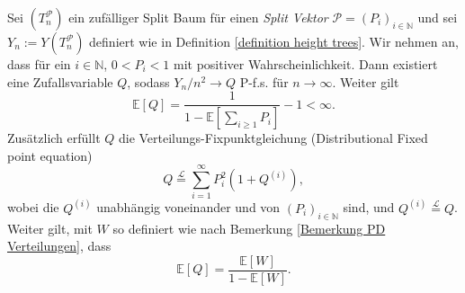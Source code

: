 \begin{theorem}
    \label{big Q theorem}
    Sei $(T_n^\mathcal{P})$ ein zufälliger Split Baum für einen \textit{Split Vektor} $\mathcal{P} = (P_i)_{i \in \mathbb{N}}$ und sei $Y_n := Y(T^\mathcal{P}_n)$ definiert wie in Definition \ref{definition height trees}. Wir nehmen an, dass für ein $i \in \mathbb{N}$, $0< P_i < 1$ mit positiver Wahrscheinlichkeit. Dann existiert eine Zufallsvariable $Q$, sodass $Y_n/n^2 \rightarrow Q$ P-f.s. für $n \to \infty$. Weiter gilt 
    \begin{equation}
        \label{first equation of Q theorem}
    \mathbb{E}[Q]  = \frac{1}{1-\mathbb{E}[\sum_{i \geq 1}P_i ]}-1 < \infty. 
    \end{equation} 
    Zusätzlich erfüllt $Q$ die Verteilungs-Fixpunktgleichung (Distributional Fixed point equation)
    \begin{equation}
        Q \stackrel{\mathcal{L}}{=} \sum_{i=1}^{\infty}P_i^2(1+Q^{(i)}),
        \label{second equation of Q theorem}
    \end{equation} 
    wobei die $Q^{(i)}$ unabhängig voneinander und von $(P_i)_{i \in \mathbb{N}}$ sind, und $Q^{(i)} \stackrel{\mathcal{L}}{=}Q$. 
    Weiter gilt, mit $W$ so definiert wie nach Bemerkung \ref{Bemerkung PD Verteilungen}, dass 
\begin{equation}
    \mathbb{E}[Q] = \frac{\mathbb{E}[W]}{1 - \mathbb{E}[W]}.
        \label{third equation of Q theorem}
\end{equation}
\end{theorem}
